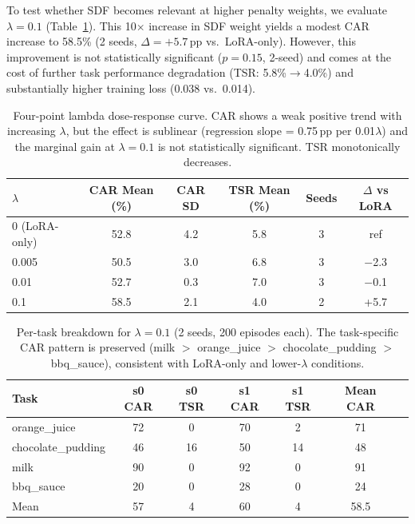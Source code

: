 \documentclass[letterpaper]{article}
\begin{document}
To test whether SDF becomes relevant at higher penalty weights, we evaluate $\lambda = 0.1$ (Table~\ref{tab:lambda-curve}). This 10$\times$ increase in SDF weight yields a modest CAR increase to 58.5\% (2 seeds, $\Delta = +5.7$\,pp vs.\ LoRA-only). However, this improvement is not statistically significant ($p = 0.15$, 2-seed) and comes at the cost of further task performance degradation (TSR: 5.8\%$\to$4.0\%) and substantially higher training loss (0.038 vs.\ 0.014).

\begin{table}[t]
\centering
\caption{Four-point lambda dose-response curve. CAR shows a weak positive trend with increasing $\lambda$, but the effect is sublinear (regression slope = 0.75\,pp per 0.01$\lambda$) and the marginal gain at $\lambda{=}0.1$ is not statistically significant. TSR monotonically decreases.}
\label{tab:lambda-curve}
\begin{tabular}{lccccc}
\toprule
$\lambda$ & CAR Mean (\%) & CAR SD & TSR Mean (\%) & Seeds & $\Delta$ vs LoRA \\
\midrule
0 (LoRA-only) & 52.8 & 4.2 & 5.8 & 3 & ref \\
0.005 & 50.5 & 3.0 & 6.8 & 3 & $-$2.3 \\
0.01 & 52.7 & 0.3 & 7.0 & 3 & $-$0.1 \\
0.1 & 58.5 & 2.1 & 4.0 & 2 & +5.7 \\
\bottomrule
\end{tabular}
\end{table}

\begin{table}[t]
\centering
\caption{Per-task breakdown for $\lambda{=}0.1$ (2 seeds, 200 episodes each). The task-specific CAR pattern is preserved (milk $>$ orange\_juice $>$ chocolate\_pudding $>$ bbq\_sauce), consistent with LoRA-only and lower-$\lambda$ conditions.}
\label{tab:lambda01-pertask}
\begin{tabular}{lcccccc}
\toprule
Task & s0 CAR & s0 TSR & s1 CAR & s1 TSR & Mean CAR \\
\midrule
orange\_juice & 72 & 0 & 70 & 2 & 71 \\
chocolate\_pudding & 46 & 16 & 50 & 14 & 48 \\
milk & 90 & 0 & 92 & 0 & 91 \\
bbq\_sauce & 20 & 0 & 28 & 0 & 24 \\
\midrule
Mean & 57 & 4 & 60 & 4 & 58.5 \\
\bottomrule
\end{tabular}
\end{table}
\end{document}
